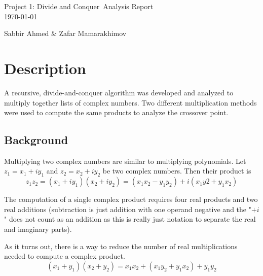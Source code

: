 \documentclass[usletter, 12pt]{article}
\newcommand{\project}{Project 1: Divide and Conquer}
\newcommand{\members}{Sabbir Ahmed \& Zafar Mamarakhimov}
\begin{document}
    \begin{titlepage}

        \vspace*{\fill} %
        \begin{center}

            {\LARGE \project~Analysis Report}\\ [1.5cm]

            \today
            
            \vspace*{\fill}

            \members

        \end{center}
        \vspace*{\fill} %

    \end{titlepage}

    \section{Description}
    A recursive, divide-and-conquer algorithm was developed and analyzed to multiply together lists of complex numbers. Two different multiplication methods were used to compute the same products to analyze the crossover point.

        \subsection{Background}

        Multiplying two complex numbers are similar to multiplying polynomials. Let $z_{1}=x_{1}+iy_{1}$ and $z_{2}=x_{2}+iy_{2}$ be two complex numbers. Then their product is
            \[ z_{1}z_{2}=(x_{1}+iy_{1})(x_{2}+iy_{2})=(x_{1}x_{2}-y_{1}y_{2})+i(x_{1}y2+y_{1}x_{2}) \]

        The computation of a single complex product requires four real products and two real additions (subtraction is just addition with one operand negative and the "$+i$" does not count as an addition as this is really just notation to separate the real and imaginary parts).

        As it turns out, there is a way to reduce the number of real multiplications needed to compute a complex product.
            \[ (x_{1}+y_{1})(x_{2}+y_{2})=x_{1}x_{2}+(x_{1}y_{2}+y_{1}x_{2})+y_{1}y_{2} \]
\end{document}
